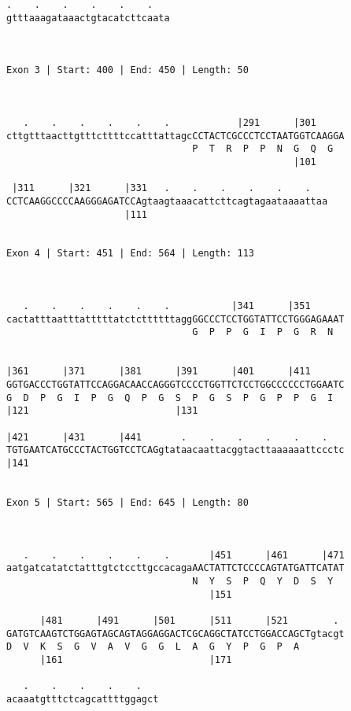 \documentclass{article}
\begin{document}
\begin{Verbatim}
.    .    .    .    .    .   
gtttaaagataaactgtacatcttcaata
                             
                             
 
Exon 3 | Start: 400 | End: 450 | Length: 50



   .    .    .    .    .    .            |291      |301     
cttgtttaacttgtttcttttccatttattagcCCTACTCGCCCTCCTAATGGTCAAGGA
                                 P  T  R  P  P  N  G  Q  G  
                                                   |101     
  
 |311      |321      |331   .    .    .    .    .    .   
CCTCAAGGCCCCAAGGGAGATCCAgtaagtaaacattcttcagtagaataaaattaa
                     |111                                
  
 
Exon 4 | Start: 451 | End: 564 | Length: 113



   .    .    .    .    .    .           |341      |351      
cactatttaatttatttttatctcttttttaggGGCCCTCCTGGTATTCCTGGGAGAAAT
                                 G  P  P  G  I  P  G  R  N  
                                                            
  
|361      |371      |381      |391      |401      |411      
GGTGACCCTGGTATTCCAGGACAACCAGGGTCCCCTGGTTCTCCTGGCCCCCCTGGAATC
G  D  P  G  I  P  G  Q  P  G  S  P  G  S  P  G  P  P  G  I  
|121                          |131                          
  
|421      |431      |441       .    .    .    .    .    .   
TGTGAATCATGCCCTACTGGTCCTCAGgtataacaattacggtacttaaaaaattccctc
|141                                                        
  
 
Exon 5 | Start: 565 | End: 645 | Length: 80



   .    .    .    .    .    .       |451      |461      |471
aatgatcatatctatttgtctccttgccacagaAACTATTCTCCCCAGTATGATTCATAT
                                 N  Y  S  P  Q  Y  D  S  Y  
                                    |151                    
  
      |481      |491      |501      |511      |521        . 
GATGTCAAGTCTGGAGTAGCAGTAGGAGGACTCGCAGGCTATCCTGGACCAGCTgtacgt
D  V  K  S  G  V  A  V  G  G  L  A  G  Y  P  G  P  A        
      |161                          |171                    
  
   .    .    .    .    .   
acaaatgtttctcagcattttggagct
                           
                           
 

\end{Verbatim}
\end{document}
